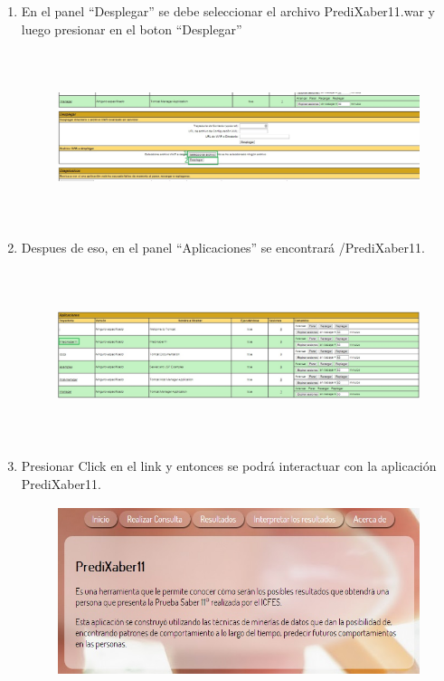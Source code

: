 \documentclass{article}
\begin{document}
\begin{enumerate}
\begin{figure}[H]
\begin{centering}
\par\end{centering}
\label{fig:figura6}
\end{figure}
\item En el panel ``Desplegar'' se debe seleccionar el archivo PrediXaber11.war y luego presionar en el boton ``Desplegar'' 
\begin{figure}[H]
\begin{centering}
\includegraphics[width=12cm, height=5cm]{tomcat7}
\par\end{centering}
\label{fig:figura6}
\end{figure}
\item Despues de eso, en el panel ``Aplicaciones'' se encontrará /PrediXaber11.
\begin{figure}[H]
\begin{centering}
\includegraphics[width=12cm, height=5cm]{tomcat8}
\par\end{centering}
\label{fig:figura6}
\end{figure}
\item Presionar Click en el link y entonces se podrá interactuar con la aplicación PrediXaber11.
\begin{figure}[H]
\begin{centering}
\includegraphics[width=12cm, height=5cm]{tomcat9}
\par\end{centering}
\label{fig:figura6}
\end{figure}
\end{enumerate}
\end{document}
